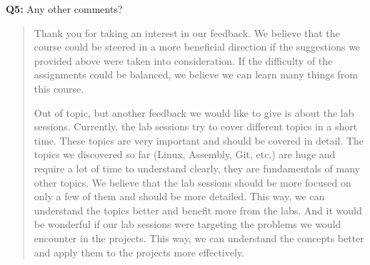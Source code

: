 \documentclass[a4paper,11pt]{paper}
\begin{document}
\textbf{Q5:} Any other comments?
\begin{quote}
Thank you for taking an interest in our feedback. We believe that the course
	could be steered in a more beneficial direction if the suggestions we provided
	above were taken into consideration. If the difficulty of the assignments could
	be balanced, we believe we can learn many things from this course.

	Out of topic, but another feedback we would like to give is about the lab sessions.
	Currently, the lab sessions try to cover different topics in a short time.
	These topics are very important and should be covered in detail. The topics
	we discovered so far (Linux, Assembly, Git, etc.) are huge and require a lot
	of time to understand clearly, they are fundamentals of many other topics.
	We believe that the lab sessions should be more focused on only a few of them
	and should be more detailed. This way, we can understand the topics better
	and benefit more from the labs. And it would be wonderful if our lab sessions
	were targeting the problems we would encounter in the projects. This way, we
	can understand the concepts better and apply them to the projects more effectively.
\end{quote}
\end{document}
